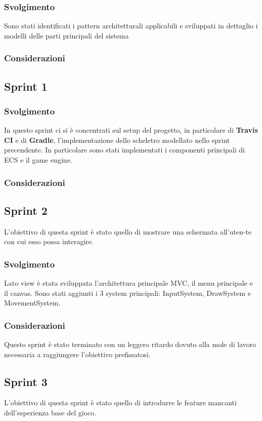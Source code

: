 \subsubsection{Svolgimento}
Sono stati identificati i pattern architetturali applicabili e sviluppati in dettaglio i modelli delle parti principali del sistema
\subsubsection{Considerazioni}

\subsection{Sprint 1}
\subsubsection{Svolgimento}
In questo sprint ci si è concentrati sul setup del progetto, in particolare di \textbf{Travis CI} e di \textbf{Gradle}, l'implementazione dello scheletro modellato nello sprint precendente.
In particolare sono stati implementati i componenti principali di ECS e il game engine.
\subsubsection{Considerazioni}
\subsection{Sprint 2}
L'obiettivo di questa sprint è stato quello di mostrare una schermata all'uten-te con cui esso possa interagire.
\subsubsection{Svolgimento}
Lato view è stata sviluppata l'architettura principale MVC, il menu principale e il canvas.
Sono stati aggiunti i 3 system principali: InputSystem, DrawSystem e MovementSystem.
\subsubsection{Considerazioni}
Questo sprint è stato terminato con un leggero ritardo dovuto alla mole di lavoro necessaria a raggiungere l'obiettivo prefissatosi.
\subsection{Sprint 3}
L'obiettivo di questa sprint è stato quello di introdurre le feature mancanti dell'esperienza base del gioco.
